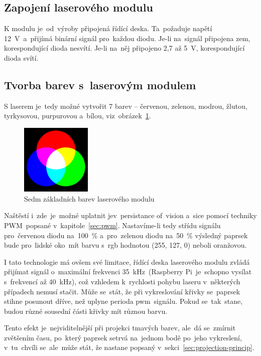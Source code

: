 \subsection{Zapojení laserového modulu}
K modulu je~od~výroby připojená řídící deska. Ta~požaduje napětí 12~V~a~přijímá binární signál pro~každou diodu. Je-li na~signál připojena zem, korespondující dioda nesvítí. Je-li na~něj připojeno 2,7 až 5~V, korespondující dioda svítí.

\subsection{Tvorba barev s~laserovým modulem}
S laserem je~tedy možné vytvořit 7 barev -- červenou, zelenou, modrou, žlutou, tyrkysovou, purpurovou a~bílou, viz~obrázek~\ref{fig:7colors}.

\begin{figure}[htb]
  \centering
  \includegraphics[width=0.3\textwidth]{img/7colors.png}
  \caption{\label{fig:7colors} Sedm základních barev laserového modulu}
\end{figure}

Naštěstí i~zde~je~možné uplatnit jev~persistance of~vision a~sice pomocí techniky PWM~popsané v~kapitole~\ref{sec:pwm}.
Nastavíme-li tedy střídu signálu pro~červenou diodu na~100~\% a~pro~zelenou diodu na~50~\% výsledný paprsek bude pro~lidské oko~mít barvu s~rgb hodnotou (255, 127, 0) neboli oranžovou.

I tato technologie má ovšem své limitace, řídící deska laserového modulu zvládá přijímat signál o~maximální frekvenci 35~kHz~(Raspberry Pi~je~schopno vysílat s~frekvencí až 40~kHz), což vzhledem k~rychlosti pohybu laseru v~některých případech nemusí stačit.
Může se~stát, že při vykreslování křivky se~paprsek stihne posunout dříve, než uplyne perioda pwm~signálu. Pokud se~tak~stane, budou různé sousední části křivky mít různou barvu.


Tento efekt je~nejviditelnější při projekci tmavých barev, ale~dá se~zmírnit zvětšením času, po~který paprsek setrvá na~jednom bodě po~jeho vykreslení, v~tu~chvíli se~ale~může stát, že nastane  popsaný v~sekci~\ref{sec:projection-princip}.